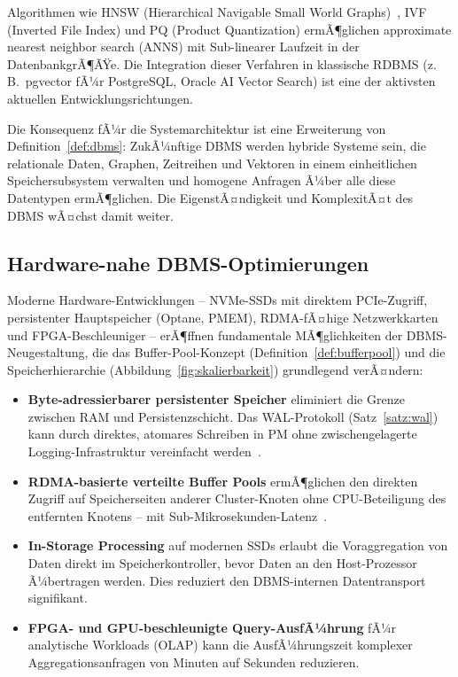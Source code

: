 ﻿\documentclass[a4paper,12pt]{article}
\theoremstyle{definition}
\begin{document}
Algorithmen wie HNSW (Hierarchical Navigable Small World Graphs)~\cite{malkov2018hnsw}, IVF (Inverted File Index) und PQ (Product Quantization) ermÃ¶glichen approximate nearest neighbor search (ANNS) mit Sub-linearer Laufzeit in der DatenbankgrÃ¶ÃŸe. Die Integration dieser Verfahren in klassische RDBMS (z.\,B.\ pgvector fÃ¼r PostgreSQL, Oracle AI Vector Search) ist eine der aktivsten aktuellen Entwicklungsrichtungen.

Die Konsequenz fÃ¼r die Systemarchitektur ist eine Erweiterung von Definition~\ref{def:dbms}: ZukÃ¼nftige DBMS werden hybride Systeme sein, die relationale Daten, Graphen, Zeitreihen und Vektoren in einem einheitlichen Speichersubsystem verwalten und homogene Anfragen Ã¼ber alle diese Datentypen ermÃ¶glichen. Die EigenstÃ¤ndigkeit und KomplexitÃ¤t des DBMS wÃ¤chst damit weiter.

\subsection{Hardware-nahe DBMS-Optimierungen}

Moderne Hardware-Entwicklungen -- NVMe-SSDs mit direktem PCIe-Zugriff, persistenter Hauptspeicher (Optane, PMEM), RDMA-fÃ¤hige Netzwerkkarten und FPGA-Beschleuniger -- erÃ¶ffnen fundamentale MÃ¶glichkeiten der DBMS-Neugestaltung, die das Buffer-Pool-Konzept (Definition~\ref{def:bufferpool}) und die Speicherhierarchie (Abbildung~\ref{fig:skalierbarkeit}) grundlegend verÃ¤ndern:

\begin{itemize}
	\item \textbf{Byte-adressierbarer persistenter Speicher} eliminiert die Grenze zwischen RAM und Persistenzschicht. Das WAL-Protokoll (Satz~\ref{satz:wal}) kann durch direktes, atomares Schreiben in PM ohne zwischengelagerte Logging-Infrastruktur vereinfacht werden~\cite{oukid2017wort}.
	\item \textbf{RDMA-basierte verteilte Buffer Pools} ermÃ¶glichen den direkten Zugriff auf Speicherseiten anderer Cluster-Knoten ohne CPU-Beteiligung des entfernten Knotens -- mit Sub-Mikrosekunden-Latenz~\cite{wei2015fast}.
	\item \textbf{In-Storage Processing} auf modernen SSDs erlaubt die Voraggregation von Daten direkt im Speicherkontroller, bevor Daten an den Host-Prozessor Ã¼bertragen werden. Dies reduziert den DBMS-internen Datentransport signifikant.
	\item \textbf{FPGA- und GPU-beschleunigte Query-AusfÃ¼hrung} fÃ¼r analytische Workloads (OLAP) kann die AusfÃ¼hrungszeit komplexer Aggregationsanfragen von Minuten auf Sekunden reduzieren.
\end{itemize}
\end{document}
